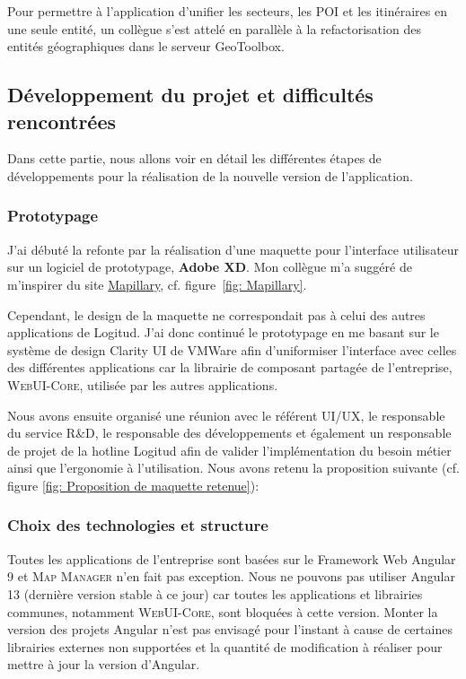 \documentclass{rapportUHA40}
\begin{document}
Pour permettre à l'application d'unifier les secteurs, les POI et les
itinéraires en une seule entité, un collègue s'est attelé en parallèle à la
refactorisation des entités géographiques dans le serveur GeoToolbox.

\subsection{Développement du projet et difficultés rencontrées}
Dans cette partie, nous allons voir en détail les différentes étapes de
développements pour la réalisation de la nouvelle version de l'application.

\subsubsection{Prototypage}
J'ai débuté la refonte par la réalisation d'une maquette pour l'interface
utilisateur sur un logiciel de prototypage, \textbf{Adobe XD}. Mon collègue m'a
suggéré de m'inspirer du site \href{https://www.mapillary.com/app/}{Mapillary},
cf. figure~\ref{fig: Mapillary}.

Cependant, le design de la maquette ne correspondait pas à celui des autres
applications de Logitud. J'ai donc continué le prototypage en me basant sur le
système de design Clarity UI de VMWare afin d'uniformiser l'interface avec
celles des différentes applications car la librairie de composant partagée de
l'entreprise, \textsc{WebUI-Core}, utilisée par les autres applications.

Nous avons ensuite organisé une réunion avec le référent UI/UX, le responsable
du service R\&D, le responsable des développements et également un responsable
de projet de la hotline Logitud afin de valider l'implémentation du besoin
métier ainsi que l'ergonomie à l'utilisation. Nous avons retenu la proposition
suivante (cf. figure \ref{fig: Proposition de maquette retenue}):

\subsubsection{Choix des technologies et structure}
Toutes les applications de l'entreprise sont basées sur le Framework Web
Angular 9 et \textsc{Map Manager} n'en fait pas exception. Nous ne pouvons pas
utiliser Angular 13 (dernière version stable à ce jour) car toutes les
applications et librairies communes, notamment \textsc{WebUI-Core}, sont
bloquées à cette version. Monter la version des projets Angular n'est pas
envisagé pour l'instant à cause de certaines librairies externes non supportées
et la quantité de modification à réaliser pour mettre à jour la version
d'Angular.
\end{document}
